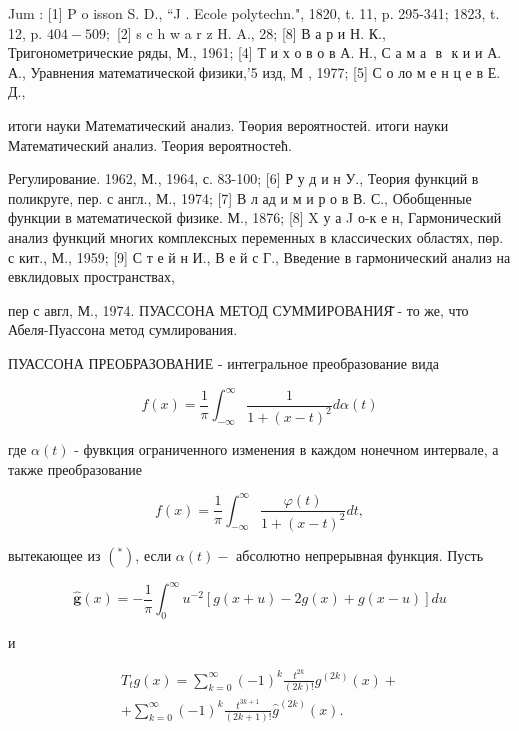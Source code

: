 \documentclass[10pt]{article}
\begin{document}
Jum : [1] P o isson S. D., “J . Ecole polytechn.", 1820, t. 11, p. 295-341; 1823, t. 12, p. $404-509 ;$ [2] s c h w a r z H. A., 28; [8] В а р и Н. К., Тригонометрические ряды, М., 1961; [4] Т и х о в о в А. Н., С а м а $\mathbf{\text { в }}$ к и и А. А., Уравнения математической физики,'5 изд, М , 1977; [5] С о ло м е н ц е в Е. Д.,

итоги науки Математический анализ. Төория вероятностей. итоги науки Математический анализ. Теория вероятностећ.

Регулирование. 1962, М., 1964, с. 83-100; [6] Р у д и н У., Теория функций в поликруге, пер. с англ., М., 1974; [7] В л ад и м и р о в В. С., Обобщенные функции в математической физике. М., 1876; [8] X у а J о-к е н, Гармонический анализ функций многих комплексных переменных в классических областях, пөр. с кит., М., 1959; [9] С т е й н И., В е й с Г., Введение в гармонический анализ на евклидовых пространствах,

пер с авгл, М., 1974. ПУАССОНА МЕТОД СУММИРОВАНИЯ̆ - то же, что Абеля-Пуассона метод сумлирования.



ПУАССОНА ПРЕОБРАЗОВАНИЕ - интегральное преобразование вида



\[

f(x)=\frac{1}{\pi} \int_{-\infty}^{\infty} \frac{1}{1+(x-t)^{2}} d \alpha(t)

\]



где $\alpha(t)$ - фувкция ограниченного изменения в каждом нонечном интервале, а также преобразование



\[

f(x)=\frac{1}{\pi} \int_{-\infty}^{\infty} \frac{\varphi(t)}{1+(x-t)^{2}} d t,

\]



вытекающее из $\left({ }^{*}\right)$, если $\alpha(t)-$ абсолютно непрерывная функция. Пусть



\[

\hat{\boldsymbol{g}}(x)=-\frac{1}{\pi} \int_{0}^{\infty} u^{-2}[g(x+u)-2 g(x)+g(x-u)] d u

\]



и



\[

\begin{gathered}

T_{t} g(x)=\sum_{k=0}^{\infty}(-1)^{k} \frac{t^{2 k}}{(2 k) !} g^{(2 k)}(x)+ \\

+\sum_{k=0}^{\infty}(-1)^{k} \frac{t^{3 k+1}}{(2 k+1) !} \hat{g}^{(2 k)}(x) .

\end{gathered}

\]
\end{document}
